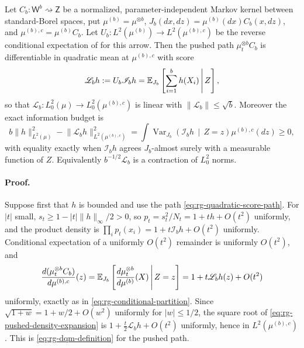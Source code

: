 Let \(C_b:\mathsf W^b\rightsquigarrow\mathsf Z\) be a normalized,
parameter-independent Markov kernel between standard-Borel spaces, put
\(\mu^{(b)}=\mu^{\otimes b}\),
\(J_b(dx,dz)=\mu^{(b)}(dx)C_b(x,dz)\), and
\(\mu^{(b),c}=\mu^{(b)}C_b\).  Let
\(U_b:L^2(\mu^{(b)})\to L^2(\mu^{(b),c})\) be the reverse conditional
expectation of  for this arrow.  Then the
pushed path \(\mu_t^{\otimes b}C_b\) is differentiable in quadratic mean at
\(\mu^{(b),c}\) with score
\begin{equation}
 \mathscr L_bh:=U_b\mathscr I_bh
 =\mathbb E_{J_b}\left[\sum_{i=1}^bh(X_i)\,\middle|\,Z\right],
 \label{eq:rg-score-renormalization-operator}
\end{equation}
so that \(\mathscr L_b:L^2_0(\mu)\to L^2_0(\mu^{(b),c})\) is linear with
\(\lVert\mathscr L_b\rVert\leq\sqrt b\).  Moreover the exact information budget
is
\begin{equation}
 b\lVert h\rVert_{L^2(\mu)}^2
 -\lVert\mathscr L_bh\rVert_{L^2(\mu^{(b),c})}^2
 =\int\operatorname{Var}_{J_b}\left(\mathscr I_bh\,\middle|\,Z=z\right)
 \mu^{(b),c}(dz)
 \geq0,
 \label{eq:rg-extensive-fisher-defect}
\end{equation}
with equality exactly when \(\mathscr I_bh\) agrees \(J_b\)-almost surely with a
measurable function of \(Z\).  Equivalently
\(b^{-1/2}\mathscr L_b\) is a contraction of \(L^2_0\) norms.

\paragraph{Proof.}
Suppose first that \(h\) is bounded and use the path
\eqref{eq:rg-quadratic-score-path}.  For \(\lvert t\rvert\) small,
\(s_t\geq1-\lvert t\rvert\lVert h\rVert_\infty/2>0\), so
\(p_t=s_t^2/N_t=1+th+O(t^2)\) uniformly, and the product density is
\(\prod_ip_t(x_i)=1+t\mathscr I_bh+O(t^2)\) uniformly.  Conditional expectation
of a uniformly \(O(t^2)\) remainder is uniformly \(O(t^2)\), and
\begin{equation}
 \frac{d(\mu_t^{\otimes b}C_b)}{d\mu^{(b),c}}(z)
 =\mathbb E_{J_b}\left[
 \frac{d\mu_t^{\otimes b}}{d\mu^{(b)}}(X)\,\middle|\,Z=z\right]
 =1+t\mathscr L_bh(z)+O(t^2)
 \label{eq:rg-pushed-density-expansion}
\end{equation}
uniformly, exactly as in \eqref{eq:rg-conditional-partition}.  Since
\(\sqrt{1+w}=1+w/2+O(w^2)\) uniformly for \(\lvert w\rvert\leq1/2\), the square
root of \eqref{eq:rg-pushed-density-expansion} is
\(1+\tfrac t2\mathscr L_bh+O(t^2)\) uniformly, hence in
\(L^2(\mu^{(b),c})\).  This is \eqref{eq:rg-dqm-definition} for the pushed path.

